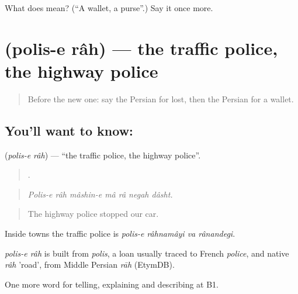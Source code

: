 \begin{tcolorbox}[breakable,colback=teal!4,colframe=teal!35!black,title={Before you move on}]
What does   mean? (\textquotedblleft{}A wallet, a purse\textquotedblright{}.) Say it once more.
\end{tcolorbox}
\section[\texorpdfstring{\fa{پلیس} \fa{راه} (polis-e râh)}{پلیس راه (polis-e râh)}]{  (polis-e râh) — the traffic police, the highway police}

\label{lesson:FA-C453-polis-e-rah}



\begin{quote}
Before the new one: say the Persian for lost, then the Persian for a wallet.
\end{quote}

\subsection*{You'll want to know:  }
\textbf{ } (\emph{polis-e râh}) — \textquotedblleft{}the traffic police, the highway police\textquotedblright{}.

\begin{quote}
      .
\end{quote}

\begin{quote}
\emph{Polis-e râh mâshin-e mâ râ negah dâsht.}
\end{quote}

\begin{quote}
The highway police stopped our car.
\end{quote}

Inside towns the traffic police is \emph{polis-e râhnamâyi va rânandegi}.

\begin{cousinweb}
\emph{polis-e râh} is built from \emph{polis}, a loan usually traced to French \emph{police}, and native \emph{râh} 'road', from Middle Persian \emph{rāh} (EtymDB).
\end{cousinweb}

\begin{grammarlens}[title={What you've built}]
One more word for telling, explaining and describing at B1.
\end{grammarlens}

